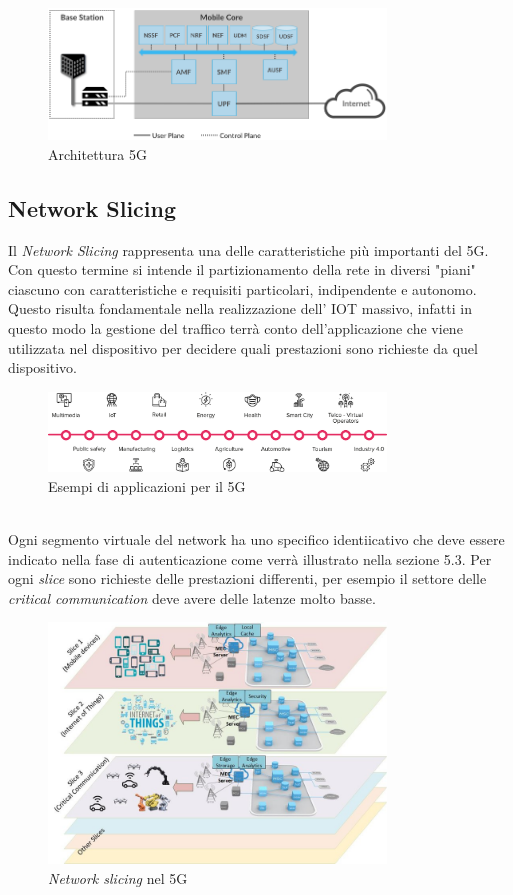 \begin{figure}[ht]
    \centering
    \includegraphics[width=0.8\textwidth]{images/5g-planes.png}
    \caption{Architettura 5G\cite{5g-approach}}
\end{figure}

\clearpage

\subsection{Network Slicing}
Il \textit{Network Slicing} rappresenta una delle caratteristiche più importanti del 5G. Con questo termine si intende il partizionamento della
rete in diversi "piani" ciascuno con caratteristiche e requisiti particolari, indipendente e autonomo. Questo risulta fondamentale nella realizzazione 
dell' IOT massivo, infatti in questo modo la gestione del traffico terrà conto dell'applicazione che viene utilizzata nel dispositivo per decidere quali prestazioni sono 
richieste da quel dispositivo.
\begin{figure}[ht]
    \centering
    \includegraphics[width=0.8\textwidth]{images/5g-eg-of-use.png}
    \caption{Esempi di applicazioni per il 5G}
\end{figure}\\
Ogni segmento virtuale del network ha uno specifico identiicativo che deve essere indicato nella fase di autenticazione come verrà illustrato nella sezione 5.3. Per ogni \textit{slice} sono 
richieste delle prestazioni differenti, per esempio il settore delle \textit{critical communication} deve avere delle latenze molto basse.
\begin{figure}[ht]
    \centering
    \includegraphics[width=0.8\textwidth]{images/5g-slicing.jpg}
    \caption{\textit{Network slicing} nel 5G}
\end{figure}\\
